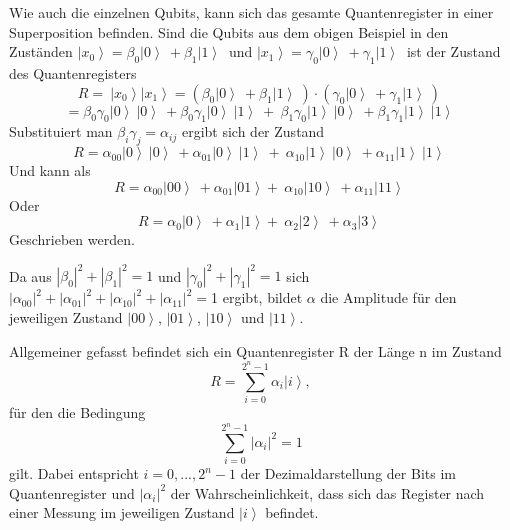 Wie auch die einzelnen Qubits, kann sich das gesamte Quantenregister in einer Superposition befinden. Sind die Qubits aus dem obigen Beispiel in den Zuständen 
$\left|\left.x_0\right\rangle\right.=\beta_0\left|\left.0\right\rangle\ \right.+\beta_1\left|\left.1\right\rangle\ \right.$ und $\left.\left|\left.x_1\right\rangle\right.=\gamma_0\left|\left.0\right\rangle\ \right.+\gamma_1\left|\left.1\right\rangle\ \right.\right.$
ist der Zustand des Quantenregisters 
$$R=\ \left|\left.x_0\right\rangle\right.\left|\left.x_1\right\rangle\right.=\left(\beta_0\left|\left.0\right\rangle\ \right.+\beta_1\left|\left.1\right\rangle\ \right.\right)\cdot(\gamma_0\left|\left.0\right\rangle\ \right.+\gamma_1\left|\left.1\right\rangle\ \right.)\ $$
$$=\beta_0\gamma_0\left|\left.0\right\rangle\ \right.\left|\left.0\right\rangle\ \right.+\beta_0\gamma_1\left|\left.0\right\rangle\ \left|\left.1\right\rangle\ \right.\right.+\ \beta_1\gamma_0\left|\left.1\right\rangle\ \right.\left|\left.0\right\rangle\ \right.+\beta_1\gamma_1\left|\left.1\right\rangle\ \right.\left|\left.1\right\rangle\ \right.$$
Substituiert man $\beta_i\gamma_j=\alpha_{ij}$ ergibt sich der Zustand
$$R=\alpha_{00}\left|\left.0\right\rangle\ \right.\left|\left.0\right\rangle\ \right.+\alpha_{01}\left|\left.0\right\rangle\ \left|\left.1\right\rangle\ \right.\right.+\ \alpha_{10}\left|\left.1\right\rangle\ \right.\left|\left.0\right\rangle\ \right.+\alpha_{11}\left|\left.1\right\rangle\ \right.\left|\left.1\right\rangle\ \right.$$
Und kann als
$$R=\alpha_{00}\left|\left.00\right\rangle\ \right.+\alpha_{01}\left|\left.01\right\rangle\right.+\ \alpha_{10}\left|\left.10\right\rangle\ \right.+\alpha_{11}\left|\left.11\right\rangle\ \right.$$
Oder
$$R=\alpha_0\left|\left.0\right\rangle\ \right.+\alpha_1\left|\left.1\right\rangle\right.+\ \alpha_2\left|\left.2\right\rangle\ \right.+\alpha_3\left|\left.3\right\rangle\ \right.$$
Geschrieben werden.

Da aus $\left|\beta_0\right|^2+\left|\beta_1\right|^2=1$ und $\left|\gamma_0\right|^2+\left|\gamma_1\right|^2=1$ sich $\left|\alpha_{00}\right|^2+\left|\alpha_{01}\right|^2+\left|\alpha_{10}\right|^2+\left|\alpha_{11}\right|^2=$1 ergibt, bildet $\alpha$ die Amplitude für den jeweiligen Zustand $\left|\left.00\right\rangle\right.$, $\left|\left.01\right\rangle\right.$, $\left|\left.10\right\rangle\right.$ und $\left|\left.11\right\rangle\right.$. 

Allgemeiner gefasst befindet sich ein Quantenregister R der Länge n im Zustand 
$$R=\sum_{i=0}^{2^n-1}{\alpha_i\left|\left.i\right\rangle\right.},$$
für den die Bedingung
$$\sum_{i=0}^{2^n-1}\left|\alpha_i\right|^2=1$$
gilt. Dabei entspricht $i=0,...,2^n-1$ der Dezimaldarstellung der Bits im Quantenregister und $\left|\alpha_i\right|^2$ der Wahrscheinlichkeit, dass sich das Register nach einer Messung im jeweiligen Zustand $\left|\left.i\right\rangle\right.$ befindet.

